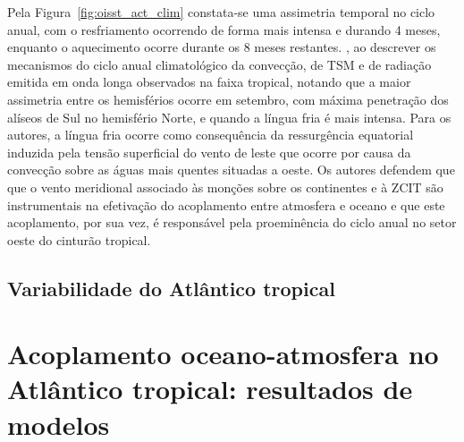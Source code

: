 Pela Figura~\ref{fig:oisst_act_clim} constata-se uma assimetria temporal no ciclo anual, com o resfriamento ocorrendo de forma mais intensa e durando 4 meses, enquanto o aquecimento ocorre durante os 8 meses restantes. \cite{Mitchell/1992}, ao descrever os mecanismos do ciclo anual climatológico da convecção, de TSM e de radiação emitida em onda longa observados na faixa tropical, notando que a maior assimetria entre os hemisférios ocorre em setembro, com máxima penetração dos alíseos de Sul no hemisfério Norte, e quando a língua fria é mais intensa. Para os autores, a língua fria ocorre como consequência da ressurgência equatorial induzida pela tensão superficial do vento de leste que ocorre por causa da convecção sobre as águas mais quentes situadas a oeste. Os autores defendem que que o vento meridional associado às monções sobre os continentes e à ZCIT são instrumentais na efetivação do acoplamento entre atmosfera e oceano e que este acoplamento, por sua vez, é responsável pela proeminência do ciclo anual no setor oeste do cinturão tropical.










\subsection{Variabilidade do Atlântico tropical}

\section{Acoplamento oceano-atmosfera no Atlântico tropical: resultados de modelos}